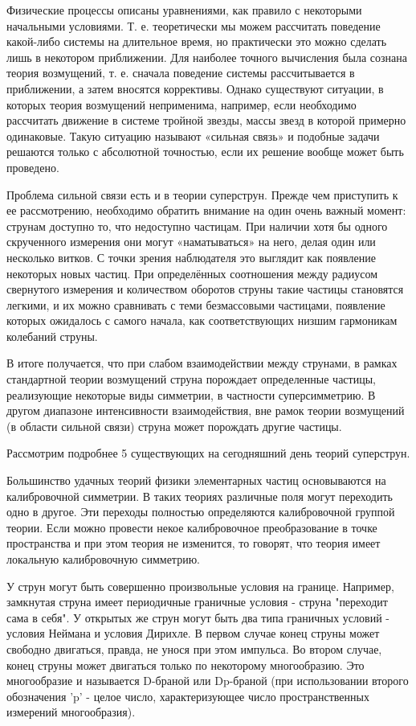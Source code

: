 Физические процессы описаны уравнениями, как правило с некоторыми начальными условиями. Т. е. теоретически мы можем рассчитать поведение какой-либо системы на длительное время, но практически это можно сделать лишь в некотором приближении. Для наиболее точного вычисления была сознана теория возмущений, т. е. сначала поведение системы рассчитывается в приближении, а затем вносятся коррективы. Однако существуют ситуации, в которых теория возмущений неприменима, например, если необходимо рассчитать движение в системе тройной звезды, массы звезд в которой примерно одинаковые. Такую ситуацию называют «сильная связь» и подобные задачи решаются только с абсолютной точностью, если их решение вообще может быть проведено. 

Проблема сильной связи есть и в теории суперструн. Прежде чем приступить к ее рассмотрению, необходимо обратить внимание на один очень важный момент: струнам доступно то, что недоступно частицам. При наличии хотя бы одного скрученного измерения они могут «наматываться» на него, делая один или несколько витков. С точки зрения наблюдателя это выглядит как появление некоторых новых частиц. При определённых соотношения между радиусом свернутого измерения и количеством оборотов струны такие частицы становятся легкими, и их можно сравнивать с теми безмассовыми частицами, появление которых ожидалось с самого начала, как соответствующих низшим гармоникам колебаний струны.

В итоге получается, что при слабом взаимодействии между струнами, в рамках стандартной теории возмущений струна порождает определенные частицы, реализующие некоторые виды симметрии, в частности суперсимметрию. В другом диапазоне интенсивности взаимодействия, вне рамок теории возмущений (в области сильной связи) струна может порождать другие частицы.

Рассмотрим подробнее 5 существующих на сегодняшний день теорий суперструн.

Большинство удачных теорий физики элементарных частиц основываются на калибровочной симметрии. В таких теориях различные поля могут переходить одно в другое. Эти переходы полностью определяются калибровочной группой теории. Если можно провести некое калибровочное преобразование в точке пространства и при этом теория не изменится, то говорят, что теория имеет локальную калибровочную симметрию.

У струн могут быть совершенно произвольные условия на границе. Например, замкнутая струна имеет периодичные граничные условия - струна "переходит сама в себя". У открытых же струн могут быть два типа граничных условий - условия Неймана и условия Дирихле. В первом случае конец струны может свободно двигаться, правда, не унося при этом импульса. Во втором  случае, конец струны может двигаться только по некоторому многообразию. Это многообразие и называется D-браной или Dp-браной (при использовании второго обозначения 'p' - целое число, характеризующее число пространственных измерений многообразия).

